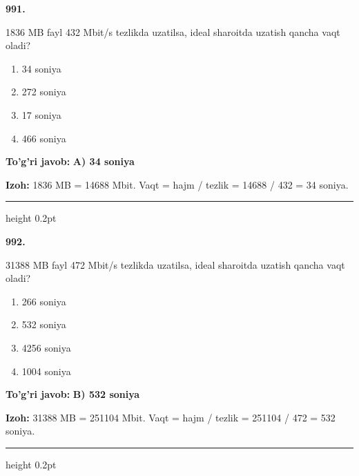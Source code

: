 \documentclass[10pt,a4paper,oneside]{article}
\begin{document}
\noindent\textbf{\color{ink}991.}
\par
1836 MB fayl 432 Mbit/s tezlikda uzatilsa, ideal sharoitda uzatish qancha vaqt oladi?
\begin{enumerate}[label=\Alph*),leftmargin=9mm]
\item 34 soniya
\item 272 soniya
\item 17 soniya
\item 466 soniya
\end{enumerate}
\begin{tcolorbox}[enhanced,breakable,colback=teal!4,colframe=teal!50!black,boxrule=0.5pt,arc=1.1mm,left=3mm,right=3mm,top=1.7mm,bottom=1.7mm,before skip=2mm,after skip=2mm]
\textbf{\color{teal}To'g'ri javob:} \textbf{A) 34 soniya}
\par\smallskip
\textbf{Izoh:} 1836 MB = 14688 Mbit. Vaqt = hajm / tezlik = 14688 / 432 = 34 soniya.
\end{tcolorbox}
\vspace{2mm}\hrule height 0.2pt \vspace{3mm}

\noindent\textbf{\color{ink}992.}
\par
31388 MB fayl 472 Mbit/s tezlikda uzatilsa, ideal sharoitda uzatish qancha vaqt oladi?
\begin{enumerate}[label=\Alph*),leftmargin=9mm]
\item 266 soniya
\item 532 soniya
\item 4256 soniya
\item 1004 soniya
\end{enumerate}
\begin{tcolorbox}[enhanced,breakable,colback=teal!4,colframe=teal!50!black,boxrule=0.5pt,arc=1.1mm,left=3mm,right=3mm,top=1.7mm,bottom=1.7mm,before skip=2mm,after skip=2mm]
\textbf{\color{teal}To'g'ri javob:} \textbf{B) 532 soniya}
\par\smallskip
\textbf{Izoh:} 31388 MB = 251104 Mbit. Vaqt = hajm / tezlik = 251104 / 472 = 532 soniya.
\end{tcolorbox}
\vspace{2mm}\hrule height 0.2pt \vspace{3mm}
\end{document}
